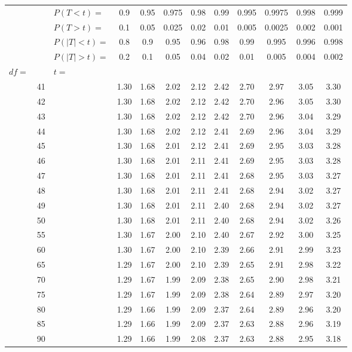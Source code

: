 \documentclass[12pt,letterpaper]{article}
\begin{document}
\begin{center}
\begin{tabular}{|l r | l c c c c c c c c c|}\hline
&& $P(T<t)=$ & 0.9 & 0.95 & 0.975 & 0.98 & 0.99 & 0.995 & 0.9975 & 0.998 & 0.999\\
&& $P(T>t)=$ & 0.1 & 0.05 & 0.025 & 0.02 & 0.01 & 0.005 & 0.0025 & 0.002 & 0.001\\
&& $P(|T|<t)=$ & 0.8 & 0.9 & 0.95 & 0.96 & 0.98 & 0.99 & 0.995 & 0.996 & 0.998\\
&& $P(|T|>t)=$ & 0.2 & 0.1 & 0.05 & 0.04 & 0.02 & 0.01 & 0.005 & 0.004 & 0.002\\\hline
$df=$ && $t=$ & & & & & & & & &\\ 
&41&& 1.30 & 1.68 & 2.02 & 2.12 & 2.42 & 2.70 & 2.97 & 3.05 & 3.30\\ 
&42&& 1.30 & 1.68 & 2.02 & 2.12 & 2.42 & 2.70 & 2.96 & 3.05 & 3.30\\ 
&43&& 1.30 & 1.68 & 2.02 & 2.12 & 2.42 & 2.70 & 2.96 & 3.04 & 3.29\\ 
&44&& 1.30 & 1.68 & 2.02 & 2.12 & 2.41 & 2.69 & 2.96 & 3.04 & 3.29\\ 
&45&& 1.30 & 1.68 & 2.01 & 2.12 & 2.41 & 2.69 & 2.95 & 3.03 & 3.28\\ 
&46&& 1.30 & 1.68 & 2.01 & 2.11 & 2.41 & 2.69 & 2.95 & 3.03 & 3.28\\ 
&47&& 1.30 & 1.68 & 2.01 & 2.11 & 2.41 & 2.68 & 2.95 & 3.03 & 3.27\\ 
&48&& 1.30 & 1.68 & 2.01 & 2.11 & 2.41 & 2.68 & 2.94 & 3.02 & 3.27\\ 
&49&& 1.30 & 1.68 & 2.01 & 2.11 & 2.40 & 2.68 & 2.94 & 3.02 & 3.27\\ 
&50&& 1.30 & 1.68 & 2.01 & 2.11 & 2.40 & 2.68 & 2.94 & 3.02 & 3.26\\
&55&& 1.30 & 1.67 & 2.00 & 2.10 & 2.40 & 2.67 & 2.92 & 3.00 & 3.25\\
&60&& 1.30 & 1.67 & 2.00 & 2.10 & 2.39 & 2.66 & 2.91 & 2.99 & 3.23\\ 
&65&& 1.29 & 1.67 & 2.00 & 2.10 & 2.39 & 2.65 & 2.91 & 2.98 & 3.22\\ 
&70&& 1.29 & 1.67 & 1.99 & 2.09 & 2.38 & 2.65 & 2.90 & 2.98 & 3.21\\ 
&75&& 1.29 & 1.67 & 1.99 & 2.09 & 2.38 & 2.64 & 2.89 & 2.97 & 3.20\\ 
&80&& 1.29 & 1.66 & 1.99 & 2.09 & 2.37 & 2.64 & 2.89 & 2.96 & 3.20\\ 
&85&& 1.29 & 1.66 & 1.99 & 2.09 & 2.37 & 2.63 & 2.88 & 2.96 & 3.19\\ 
&90&& 1.29 & 1.66 & 1.99 & 2.08 & 2.37 & 2.63 & 2.88 & 2.95 & 3.18\\ 

\end{tabular}
\end{center}
\end{document}
